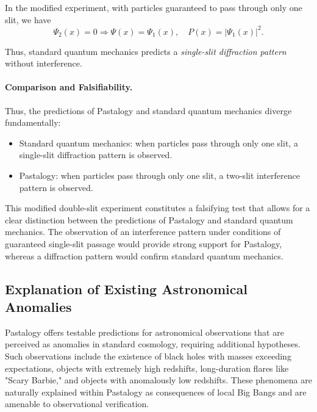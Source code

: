\documentclass[pdflatex,sn-mathphys-num]{sn-jnl}
\begin{document}
In the modified experiment, with particles guaranteed to pass through only one slit, we have
\begin{equation}
    \Psi_2(x) = 0 \Rightarrow \Psi(x) = \Psi_1(x), \quad P(x) = |\Psi_1(x)|^2.
\end{equation}

Thus, standard quantum mechanics predicts a \emph{single-slit diffraction pattern} without interference.

\paragraph{Comparison and Falsifiability.} Thus, the predictions of Pastalogy and standard quantum mechanics diverge fundamentally:
\begin{itemize}
    \item Standard quantum mechanics: when particles pass through only one slit, a single-slit diffraction pattern is observed.
    \item Pastalogy: when particles pass through only one slit, a two-slit interference pattern is observed.
\end{itemize}
This modified double-slit experiment constitutes a falsifying test that allows for a clear distinction between the predictions of Pastalogy and standard quantum mechanics. The observation of an interference pattern under conditions of guaranteed single-slit passage would provide strong support for Pastalogy, whereas a diffraction pattern would confirm standard quantum mechanics.

\subsection{Explanation of Existing Astronomical Anomalies}\label{subsec:astronomical-anomalies}

Pastalogy offers testable predictions for astronomical observations that are perceived as anomalies in standard cosmology, requiring additional hypotheses. Such observations include the existence of black holes with masses exceeding expectations, objects with extremely high redshifts, long-duration flares like "Scary Barbie," and objects with anomalously low redshifts. These phenomena are naturally explained within Pastalogy as consequences of local Big Bangs and are amenable to observational verification.
\end{document}
